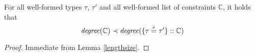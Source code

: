 \begin{Lemma}\label{lem-termination-3}
For all well-formed types $\tau$, $\tau'$ and all well-formed list of
constraints $\mathbb{C}$, it holds that 
  \[ \text{\it degree\/}(\mathbb{C}) \prec \text{\it degree\/}(\{\tau \overset{e}{=} \tau'\} :: \mathbb{C})\]
\end{Lemma}
\begin{proof}
Immediate from Lemma \ref{lengthsize}.
\end{proof}
